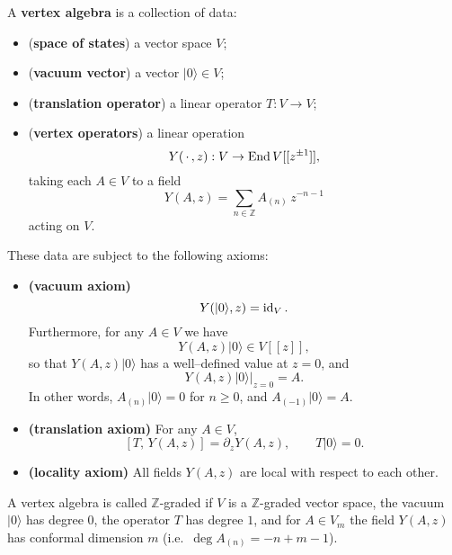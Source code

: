 \documentclass[12pt]{article}
\begin{document}
\begin{definition}
A \textbf{vertex algebra} is a collection of data:
\begin{itemize}
    \item (\textbf{space of states}) a vector space $V$;
    \item (\textbf{vacuum vector}) a vector $\lvert 0 \rangle \in V$;
    \item (\textbf{translation operator}) a linear operator $T : V \to V$;
    \item (\textbf{vertex operators}) a linear operation
    \[
        Y(\,\cdot\,,z) : V \to \operatorname{End} V[[z^{\pm1}]],
    \]
    taking each $A \in V$ to a field
    \[
        Y(A,z) = \sum_{n \in \mathbb{Z}} A_{(n)}\,z^{-n-1}
    \]
    acting on $V$.
\end{itemize}

These data are subject to the following axioms:
\begin{itemize}
    \item \textbf{(vacuum axiom)} 
    \[
        Y(\lvert 0 \rangle, z) = \operatorname{id}_V.
    \]
    Furthermore, for any $A \in V$ we have
    \[
        Y(A,z)\lvert 0 \rangle \in V[[z]],
    \]
    so that $Y(A,z)\lvert 0 \rangle$ has a well–defined value at $z=0$, and
    \[
        Y(A,z)\lvert 0 \rangle\big|_{z=0} = A.
    \]
    In other words, $A_{(n)}\lvert 0 \rangle = 0$ for $n \ge 0$, and 
    $A_{(-1)}\lvert 0 \rangle = A$.
    
    \item \textbf{(translation axiom)}
    For any $A \in V$,
    \[
        [T,\,Y(A,z)] = \partial_z Y(A,z),
    \qquad
    T\lvert 0 \rangle = 0.
    \]

    \item \textbf{(locality axiom)}
    All fields $Y(A,z)$ are local with respect to each other.
\end{itemize}

A vertex algebra is called \(\mathbb{Z}\)-graded if \(V\) is a 
\(\mathbb{Z}\)-graded vector space, 
the vacuum \(\lvert 0 \rangle\) has degree \(0\),
the operator \(T\) has degree \(1\), and for \(A \in V_m\) the field \(Y(A,z)\) 
has conformal dimension \(m\) (i.e.\ $\deg A_{(n)} = -n + m - 1$).
\end{definition}
\end{document}
